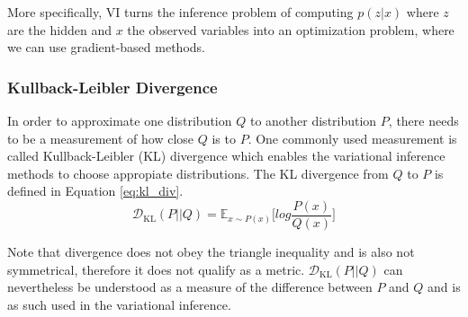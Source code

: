 More specifically, VI turns the inference problem of computing $p(z|x)$ where $z$ are the hidden and $x$ the observed variables into an optimization problem, where we can use gradient-based methods.


\subsubsection{Kullback-Leibler Divergence}
In order to approximate one distribution $Q$ to another distribution $P$, there needs to be a measurement of how close $Q$ is to $P$.
One commonly used measurement is called Kullback-Leibler (KL) divergence\cite{kl_div:1951} which enables the variational inference methods to choose appropiate distributions.
The KL divergence from $Q$ to $P$ is defined in Equation \ref{eq:kl_div}.
\begin{equation}
  \label{eq:kl_div}
  \mathcal{D}_{\mathrm{KL}}(P || Q) = \mathbb{E}_{x \sim P(x)}\bigg[log \frac{P(x)}{Q(x)}\bigg]
\end{equation}

Note that divergence does not obey the triangle inequality and is also not symmetrical, therefore it does not qualify as a metric.
$\mathcal{D}_{\mathrm{KL}}(P||Q)$ can nevertheless be understood as a measure of the difference between $P$ and $Q$ and is as such used in the variational inference.


